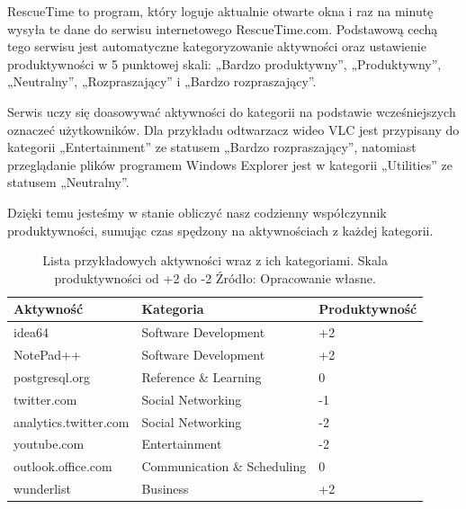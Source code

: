 \documentclass[brudnopis]{xmgr}
\begin{document}

        RescueTime to program, który loguje aktualnie otwarte okna
        i raz na minutę wysyła te dane do serwisu internetowego RescueTime.com.
        Podstawową cechą tego serwisu jest automatyczne kategoryzowanie aktywności oraz ustawienie produktywności w 5 punktowej skali:
        „Bardzo produktywny”, „Produktywny”, „Neutralny”, „Rozpraszający” i „Bardzo rozpraszający”.

        Serwis uczy się doasowywać aktywności do kategorii na podstawie wcześniejszych oznaczeć użytkowników.
        Dla przykładu odtwarzacz wideo VLC jest przypisany do kategorii „Entertainment” ze statusem „Bardzo rozpraszający”,
        natomiast przeglądanie plików programem Windows Explorer jest w kategorii „Utilities” ze statusem „Neutralny”.

        Dzięki temu jesteśmy w stanie obliczyć nasz codzienny współczynnik produktywności,
        sumując czas spędzony na aktywnościach z każdej kategorii.

        \begin{table}[]
        \centering
        \begin{tabular}{lll}
        \hline
        \multicolumn{1}{l|}{Aktywność} & \multicolumn{1}{l|}{Kategoria} & Produktywność \\ \hline
        idea64                         & Software Development           & +2            \\
        NotePad++                      & Software Development           & +2            \\
        postgresql.org                 & Reference \& Learning          & 0             \\
        twitter.com                    & Social Networking              & -1            \\
        analytics.twitter.com          & Social Networking              & -2            \\
        youtube.com                    & Entertainment                  & -2            \\
        outlook.office.com             & Communication \& Scheduling    & 0             \\
        wunderlist                     & Business                       & +2
        \end{tabular}
        \caption{
            Lista przykładowych aktywności wraz z ich kategoriami. Skala produktywności od +2 do -2
            \newline Źródło: Opracowanie własne.
        }
        \label{RescueTime --- lista przykładowych aktywności}
        \end{table}
\end{document}
